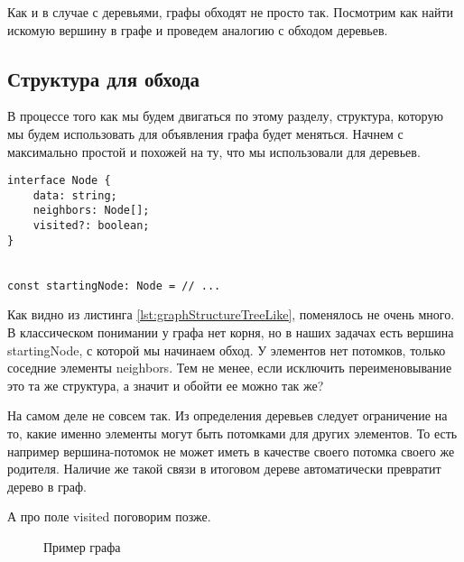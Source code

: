 \documentclass[../article.tex]{subfiles}
\begin{document}

{Как и в случае с деревьями, графы обходят не просто так. Посмотрим как найти искомую вершину в графе и проведем аналогию с обходом деревьев.}

\subsection{Структура для обхода}

В процессе того как мы будем двигаться по этому разделу, структура, которую мы будем использовать для объявления графа будет меняться. Начнем с максимально простой и похожей на ту, что мы использовали для деревьев.

\begin{ruledelement}
    \begin{lstlisting}[caption={Структура вершины графа}, label={lst:graphStructureTreeLike}]
interface Node {
    data: string;
    neighbors: Node[];
    visited?: boolean;
}


const startingNode: Node = // ...
    \end{lstlisting}
\end{ruledelement}

Как видно из листинга \ref{lst:graphStructureTreeLike}, поменялось не очень много. В классическом понимании у графа нет корня, но в наших задачах есть вершина {\firacodebold startingNode}, с которой мы начинаем обход. У элементов нет потомков, только соседние элементы {\firacodebold neighbors}. Тем не менее, если исключить переименовывание это та же структура, а значит и обойти ее можно так же?

На самом деле не совсем так. Из определения деревьев следует ограничение на то, какие именно элементы могут быть потомками для других элементов. То есть например вершина-потомок не может иметь в качестве своего потомка своего же родителя. Наличие же такой связи в итоговом дереве автоматически превратит дерево в граф.

А про поле {\firacodebold visited} поговорим позже.

\begin{figure}
    \caption{Пример графа}
    \label{fig:treeTurningToGraph}
\end{figure}
\end{document}
